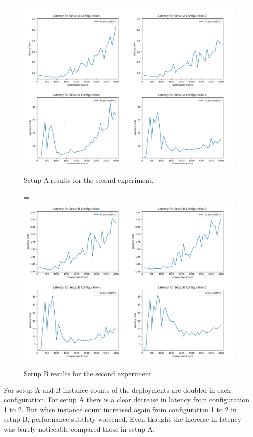 \documentclass[12pt,oneandhalf,chaparabic,ceng,ms,eng,oneside,pntc]{gsufbe}
\makeatletter
\let\old@includegraphics\includegraphics
\renewcommand{\includegraphics}[2][,]{%
  \setbox9=\hbox{\old@includegraphics[#1]{#2}}%
  \ifdim\wd9>\textwidth
    \old@includegraphics[#1,width=\textwidth]{#2}%
  \else
    \old@includegraphics[#1]{#2}%
  \fi%
}
\makeatother
\begin{document}
\begin{figure}
\centering
\includegraphics[]{setupa.png}
\caption{Setup A results for the second experiment.}
\label{fig:setupa}
\end{figure}

\begin{figure}
\centering
\includegraphics[]{setupb.png}
\caption{Setup B results for the second experiment.}
\label{fig:setupb}
\end{figure}

For setup A and B instance counts of the deployments are doubled in each configuration. For setup A
there is a clear decrease in latency from configuration 1 to 2. But when instance count
increased again from configuration 1 to 2 in setup B, performance subtlety worsened. Even thought
the increase in latency was barely noticeable compared those in setup A.
\end{document}
